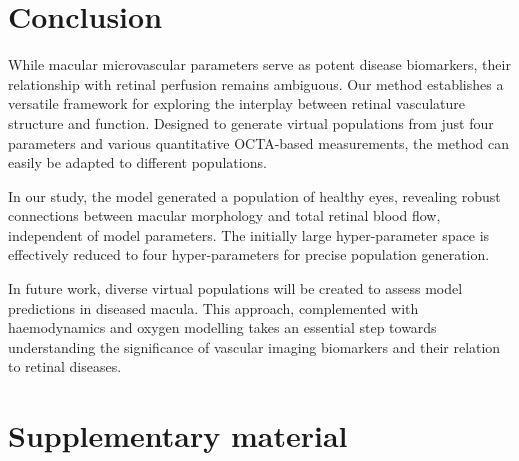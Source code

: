 \documentclass[11pt,]{article}
\newcommand{\supplementarysection}{%
  \setcounter{figure}{0}%
  \setcounter{table}{0}
  \let\oldthefigure\thefigure%
  \let\oldthetable\thetable
  \renewcommand{\thefigure}{S\oldthefigure}%
  \renewcommand{\thetable}{S\oldthetable}
  \section{Supplementary material}%
  \let\oldsection\section%
  \renewcommand{\section}{%
    \let\thefigure\oldthefigure%
    \let\section\oldsection%
    \oldsection%
  }
}
\begin{document}
\section{Conclusion}\label{sec:conclusion}

While macular microvascular parameters serve as potent disease biomarkers, their relationship with retinal perfusion remains ambiguous.
Our method establishes a versatile framework for exploring the interplay between retinal vasculature structure and function.
Designed to generate virtual populations from just four parameters and various quantitative OCTA-based measurements, the method can easily be adapted to different populations.

In our study, the model generated a population of healthy eyes, revealing robust connections between macular morphology and total retinal blood flow, independent of model parameters.
The initially large hyper-parameter space is effectively reduced to four hyper-parameters for precise population generation.

In future work, diverse virtual populations will be created to assess model predictions in diseased macula.
This approach, complemented with haemodynamics and oxygen modelling takes an essential step towards understanding the significance of vascular imaging biomarkers and their relation to retinal diseases.



\supplementarysection
\end{document}
